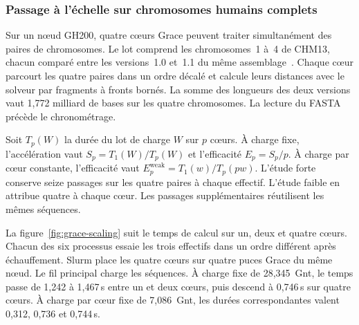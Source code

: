 \subsubsection{Passage à l’échelle sur chromosomes humains complets}\label{sec:grace-chromosomes}
Sur un nœud GH200, quatre cœurs Grace peuvent traiter simultanément des paires de chromosomes. Le lot comprend les chromosomes~1 à~4 de CHM13, chacun comparé entre les versions~1.0 et~1.1 du même assemblage~\cite{chmreleases}. Chaque cœur parcourt les quatre paires dans un ordre décalé et calcule leurs distances avec le solveur par fragments à fronts bornés. La somme des longueurs des deux versions vaut 1,772 milliard de bases sur les quatre chromosomes. La lecture du FASTA précède le chronométrage.

Soit \(T_p(W)\) la durée du lot de charge \(W\) sur \(p\) cœurs. À charge fixe, l’accélération vaut \(S_p=T_1(W)/T_p(W)\) et l’efficacité \(E_p=S_p/p\). À charge par cœur constante, l’efficacité vaut \(E_p^{\mathrm{weak}}=T_1(w)/T_p(pw)\). L’étude forte conserve seize passages sur les quatre paires à chaque effectif. L’étude faible en attribue quatre à chaque cœur. Les passages supplémentaires réutilisent les mêmes séquences.

La figure~\ref{fig:grace-scaling} suit le temps de calcul sur un, deux et quatre cœurs. Chacun des six processus essaie les trois effectifs dans un ordre différent après échauffement. Slurm place les quatre cœurs sur quatre puces Grace du même nœud. Le fil principal charge les séquences. À charge fixe de 28,345~Gnt, le temps passe de 1,242 à 1,467\,s entre un et deux cœurs, puis descend à 0,746\,s sur quatre cœurs. À charge par cœur fixe de 7,086~Gnt, les durées correspondantes valent 0,312, 0,736 et 0,744\,s.

